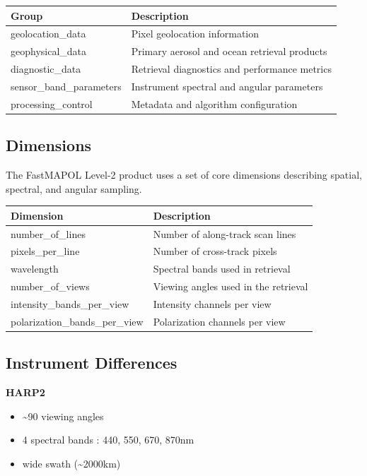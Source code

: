 \documentclass[
  11pt,
  letterpaper,
  DIV=11,
  numbers=noendperiod]{scrreprt}
\providecommand{\tightlist}{%
  \setlength{\itemsep}{0pt}\setlength{\parskip}{0pt}}
\begin{document}
\begin{longtable}[]{@{}ll@{}}
\toprule\noalign{}
Group & Description \\
\midrule\noalign{}
\endhead
\bottomrule\noalign{}
\endlastfoot
geolocation\_data & Pixel geolocation information \\
geophysical\_data & Primary aerosol and ocean retrieval products \\
diagnostic\_data & Retrieval diagnostics and performance metrics \\
sensor\_band\_parameters & Instrument spectral and angular parameters \\
processing\_control & Metadata and algorithm configuration \\
\end{longtable}

\subsection{Dimensions}\label{dimensions}

The FastMAPOL Level-2 product uses a set of core dimensions describing
spatial, spectral, and angular sampling.

\begin{longtable}[]{@{}ll@{}}
\toprule\noalign{}
Dimension & Description \\
\midrule\noalign{}
\endhead
\bottomrule\noalign{}
\endlastfoot
number\_of\_lines & Number of along-track scan lines \\
pixels\_per\_line & Number of cross-track pixels \\
wavelength & Spectral bands used in retrieval \\
number\_of\_views & Viewing angles used in the retrieval \\
intensity\_bands\_per\_view & Intensity channels per view \\
polarization\_bands\_per\_view & Polarization channels per view \\
\end{longtable}

\subsection{Instrument Differences}\label{instrument-differences}

\textbf{HARP2}

\begin{itemize}
\tightlist
\item
  \textasciitilde90 viewing angles\\
\item
  4 spectral bands : 440, 550, 670, 870nm
\item
  wide swath (\textasciitilde2000km)
\end{itemize}
\end{document}
